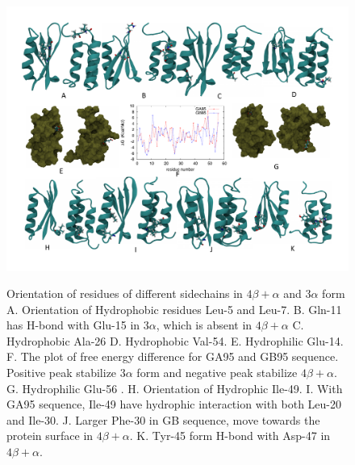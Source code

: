 \documentclass[12pt]{article}
\begin{document}
\begin{figure}
\includegraphics[width=7 in,height=5.8 in]{orban_full.pdf}
\label{fig:orban_full}
\caption{Orientation of residues of different sidechains in $4 \beta + \alpha$ and $3 \alpha$ form
A. Orientation of Hydrophobic residues Leu-5 and Leu-7.
B. Gln-11 has H-bond with Glu-15 in $3 \alpha$, which is absent in $4 \beta + \alpha$
C. Hydrophobic Ala-26
D. Hydrophobic Val-54.
E. Hydrophilic Glu-14.
F. The plot of free energy difference for GA95 and GB95 sequence. Positive peak stabilize $3 \alpha$ form and negative peak 
stabilize $4 \beta + \alpha$. 
G. Hydrophilic Glu-56 .
H. Orientation of Hydrophic Ile-49.
I. With GA95 sequence, Ile-49 have hydrophic interaction with both Leu-20 and Ile-30.
J. Larger Phe-30 in GB sequence, move towards the protein surface in $4 \beta + \alpha$.
K. Tyr-45 form H-bond with Asp-47 in $4 \beta + \alpha$.}  
\end{figure}
\end{document}
